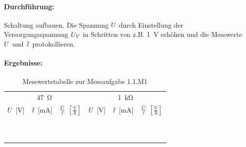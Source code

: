 \documentclass[11pt,a4paper,titlepage,parskip=half]{scrreprt}
\begin{document}
            \paragraph{Durchführung:} Schaltung aufbauen. Die Spannung $\textcolor{blue}{U}$ durch Einstellung der Versorgungsspannung $\textcolor{blue}{U_V}$ in Schritten von z.B. \SI{1}{\volt} erhöhen und die Messwerte $\textcolor{blue}{U}$ und $\textcolor{red}{I}$ protokollieren. 
          \paragraph{Ergebnisse:}
                 \begin{center}
                    \begin{table}[H]
                        \caption{Messwertetabelle zur Messaufgabe 1.1.M1}
                        \label{tbl:messergebnisse1.1}
                        \renewcommand{\arraystretch}{1.6}
                        \begin{center}
                            \begin{tabular}{c|c|c|c|c|c}
                                \multicolumn{3}{c|}{\SI{47}{\ohm}} & \multicolumn{3}{c}{\SI{1}{\kilo\ohm}} \\ 
                                $\textcolor{blue}{U}$ [\si{\volt}] &
                                $\textcolor{red}{I}$ [\si{\milli\ampere}] &
                                $\frac{\textcolor{blue}{U}}{\textcolor{red}{I}}$ $\left[\frac{\si{\volt}}{\si{\ampere}}\right]$&
                                $\textcolor{blue}{U}$ [\si{\volt}] &
                                $\textcolor{red}{I}$ [\si{\milli\ampere}] &
                                $\frac{\textcolor{blue}{U}}{\textcolor{red}{I}}$ $\left[\frac{\si{\volt}}{\si{\ampere}}\right]$ \\ \hline
                                
                                \qquad\qquad\qquad & \qquad\qquad\qquad & \qquad\qquad\qquad & \qquad\qquad\qquad & \qquad\qquad\qquad & \qquad\qquad\qquad\\\hline
                                 &  &  &  &  & \\\hline
                                 &  &  &  &  & \\\hline
                                 &  &  &  &  & \\\hline
                                 &  &  &  &  & \\\hline
                                 &  &  &  &  & \\\hline
                                 &  &  &  &  & \\\hline
                                 &  &  &  &  & \\\hline
                                 &  &  &  &  & \\\hline
                                 &  &  &  &  & \\
                            \end{tabular}
                        \end{center}
                    \end{table}
                \end{center}
\end{document}
